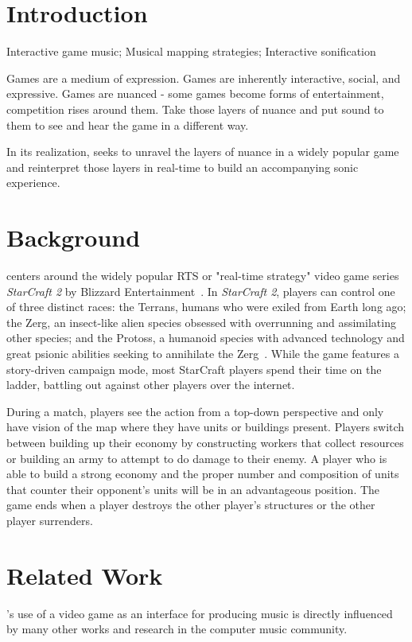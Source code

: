 \documentclass{nime-document-class}
\begin{document}
\section{Introduction}
Interactive game music; Musical mapping strategies; Interactive sonification

Games are a medium of expression. Games are inherently interactive, social, and expressive. Games are nuanced - some games become forms of entertainment, competition rises around them. Take those layers of nuance and put sound to them to see and hear the game in a different way. 

In its realization, \projectName{} seeks to unravel the layers of nuance in a widely popular game and reinterpret those layers in real-time to build an accompanying sonic experience. 

\section{Background}
\projectName{} centers around the widely popular RTS or "real-time strategy" video game series {\em StarCraft 2} by Blizzard Entertainment~\cite{Blizzard:2013:Online}.
In {\em StarCraft 2}, players can control one of three distinct races: the Terrans, humans who were exiled from Earth long ago; the Zerg, an insect-like alien species obsessed with overrunning and assimilating other species; and the Protoss, a humanoid species with advanced technology and great psionic abilities seeking to annihilate the Zerg~\cite{BlizzardRaces:2013:Online}.
While the game features a story-driven campaign mode, most StarCraft players spend their time on the ladder, battling out against other players over the internet. 

During a match, players see the action from a top-down perspective and only have vision of the map where they have units or buildings present.
Players switch between building up their economy by constructing workers that collect resources or building an army to attempt to do damage to their enemy.
A player who is able to build a strong economy and the proper number and composition of units that counter their opponent's units will be in an advantageous position.
The game ends when a player destroys the other player's structures or the other player surrenders.

\section{Related Work}
\projectName{}'s use of a video game as an interface for producing music is directly influenced by many other works and research in the computer music community.
\end{document}
